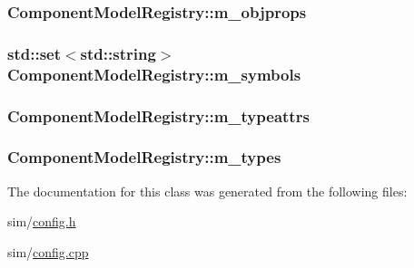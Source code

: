 \hypertarget{class_component_model_registry_a6fb1e8e4fdcc3dd78909affc77fbad56}{
\subsubsection[{m\+\_\+objprops}]{ Component\+Model\+Registry\+::m\+\_\+objprops\hspace{0.3cm}{\ttfamily [protected]}}}\label{class_component_model_registry_a6fb1e8e4fdcc3dd78909affc77fbad56}
\hypertarget{class_component_model_registry_ab66f9920fac78cc986138541f0de8383}{
\subsubsection[{m\+\_\+symbols}]{\setlength{\rightskip}{0pt plus 5cm}std\+::set$<$std\+::string$>$ Component\+Model\+Registry\+::m\+\_\+symbols\hspace{0.3cm}{\ttfamily [protected]}}}\label{class_component_model_registry_ab66f9920fac78cc986138541f0de8383}
\hypertarget{class_component_model_registry_a75b5f9994f8c432af4e951f160896652}{
\subsubsection[{m\+\_\+typeattrs}]{ Component\+Model\+Registry\+::m\+\_\+typeattrs\hspace{0.3cm}{\ttfamily [protected]}}}\label{class_component_model_registry_a75b5f9994f8c432af4e951f160896652}
\hypertarget{class_component_model_registry_a306f1c7a15084c47e5b62d1d9854b804}{
\subsubsection[{m\+\_\+types}]{ Component\+Model\+Registry\+::m\+\_\+types\hspace{0.3cm}{\ttfamily [protected]}}}\label{class_component_model_registry_a306f1c7a15084c47e5b62d1d9854b804}


The documentation for this class was generated from the following files\+:\begin{DoxyCompactItemize}
\item 
sim/\hyperlink{config_8h}{config.\+h}\item 
sim/\hyperlink{config_8cpp}{config.\+cpp}\end{DoxyCompactItemize}
